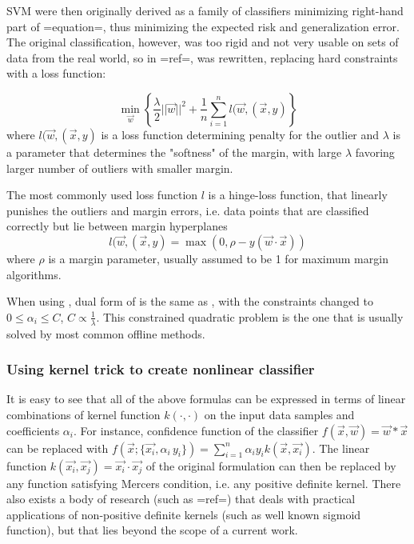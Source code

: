 SVM were then originally derived as a  family of classifiers minimizing right-hand part of {=equation=}, thus minimizing the expected risk and generalization error. The original classification, however, was too rigid  and not very usable on sets of data from the real world, so in {=ref=},  was rewritten,  replacing hard constraints with a loss function:

\begin{equation}
\label{expandedPrimal}
 \min_{\vec{w}} \left\{ \frac{\lambda}{2}||\vec{w}||^2 +\frac{1}{n}\sum_{i=1}^{n}l(\vec{w},(\vec{x},y)\right\}
\end{equation}
where $l(\vec{w},(\vec{x},y)$ is a loss function determining penalty for the outlier and $\lambda$ is a parameter that determines the "softness" of the margin, with large $\lambda$ favoring larger number of outliers with smaller margin.

The most commonly used loss function $l$ is a hinge-loss function, that linearly punishes the outliers and margin errors, i.e. data points that are classified correctly but lie between margin hyperplanes
$$
\label{Hingeloss}
l(\vec{w},(\vec{x},y)=\max(0, \rho-y(\vec{w}\cdot\vec{x}))
$$
where $\rho$ is a margin parameter, usually assumed to be 1 for maximum margin algorithms.

When using , dual form of  is the same as , with the constraints changed to $0 \le \alpha_i \le C$, $C \propto \frac{1}{\lambda}$. This constrained quadratic problem is the one that is usually solved by most common offline methods.

\subsubsection{Using kernel trick to create nonlinear classifier}

It is easy to see that all of the above formulas can be expressed in terms of linear combinations of kernel function $k(\cdot,\cdot)$ on the input data samples and coefficients $\alpha_i$. For instance, confidence function of the classifier $f(\vec{x},\vec{w})=\vec{w}*\vec{x}$  can be replaced with $f(\vec{x};\{\vec{x_i},\alpha_i\,y_i\})=\sum_{i=1}^{n}\alpha_i y_i k(\vec{x},\vec{x_i})$. The linear function $k(\vec{x_i},\vec{x_j})=\vec{x_i}\cdot \vec{x_j}$ of the original formulation can then be replaced by any function satisfying Mercers condition, i.e. any positive definite kernel. There also exists a body of research (such as {{=ref=}}) that deals with practical applications of non-positive definite kernels (such as well known sigmoid function), but that lies beyond the scope of a current work. 

